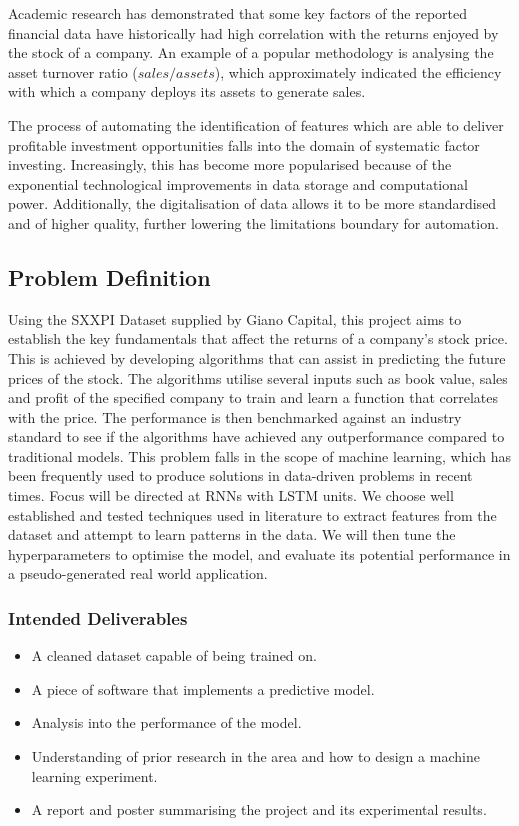 \documentclass[10pt,onecolumn,letterpaper]{article}
\begin{document}
Academic research has demonstrated that some key factors of the reported financial data have historically had high correlation with the returns enjoyed by the stock of a company. An example of a popular methodology is analysing the asset turnover ratio ($sales/assets$), which approximately indicated the efficiency with which a company deploys its assets to generate sales. 

The process of automating the identification of features which are able to deliver profitable investment opportunities falls into the domain of  systematic factor investing. Increasingly, this has become more popularised because of the exponential technological improvements in data storage and computational power. Additionally, the digitalisation of data allows it to be more standardised and of higher quality, further lowering the limitations boundary for automation.  

\subsection{Problem Definition} \label{Problem Definition}

Using the SXXPI Dataset supplied by Giano Capital, this project aims to establish the key fundamentals that affect the returns of a company's stock price. This is achieved by developing algorithms that can assist in predicting the future prices of the stock. The algorithms utilise several inputs such as book value, sales and profit of the specified company to train and learn a function that correlates with the price. The performance is then benchmarked against an industry standard to see if the algorithms have achieved any outperformance compared to traditional models. This problem falls in the scope of machine learning, which has been frequently used to produce solutions in data-driven problems in recent times. Focus will be directed at RNNs with LSTM units. We choose well established and tested techniques used in literature to extract features from the dataset and attempt to learn patterns in the data. We will then tune the hyperparameters to optimise the model, and evaluate its potential performance in a pseudo-generated real world application. 

\subsubsection{Intended Deliverables}
\begin{itemize}
	\item A cleaned dataset capable of being trained on. 
	\item A piece of software that implements a predictive model. 
	\item Analysis into the performance of the model.
	\item Understanding of prior research in the area and how to design a machine learning experiment. 
	\item A report and poster summarising the project and its experimental results.
\end{itemize}
\end{document}
